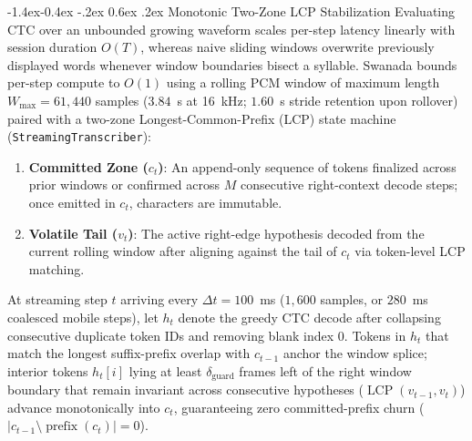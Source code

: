 \documentclass[10pt,twocolumn]{article}
\makeatletter
\renewcommand\subsection{\@startsection{subsection}{2}{\z@}%
  {-1.4ex\@plus -0.4ex \@minus -.2ex}%
  {0.6ex \@plus .2ex}%
  {\normalfont\normalsize\bfseries}}
\makeatother
\begin{document}
\subsection{Monotonic Two-Zone LCP Stabilization}
Evaluating CTC over an unbounded growing waveform scales per-step latency linearly with session duration $O(T)$, whereas naive sliding windows overwrite previously displayed words whenever window boundaries bisect a syllable. Swanada bounds per-step compute to $O(1)$ using a rolling PCM window of maximum length $W_{\max} = 61{,}440$ samples ($3.84$~s at 16~kHz; $1.60$~s stride retention upon rollover) paired with a two-zone Longest-Common-Prefix (LCP) state machine (\texttt{StreamingTranscriber}):
\begin{enumerate}\setlength{\itemsep}{1pt}\setlength{\parskip}{0pt}
    \item \textbf{Committed Zone ($c_t$)}: An append-only sequence of tokens finalized across prior windows or confirmed across $M$ consecutive right-context decode steps; once emitted in $c_t$, characters are immutable.
    \item \textbf{Volatile Tail ($v_t$)}: The active right-edge hypothesis decoded from the current rolling window after aligning against the tail of $c_t$ via token-level LCP matching.
\end{enumerate}
At streaming step $t$ arriving every $\Delta t = 100$~ms ($1{,}600$ samples, or $280$~ms coalesced mobile steps), let $h_t$ denote the greedy CTC decode after collapsing consecutive duplicate token IDs and removing blank index $0$. Tokens in $h_t$ that match the longest suffix-prefix overlap with $c_{t-1}$ anchor the window splice; interior tokens $h_t[i]$ lying at least $\delta_{\text{guard}}$ frames left of the right window boundary that remain invariant across consecutive hypotheses ($\operatorname{LCP}(v_{t-1}, v_t)$) advance monotonically into $c_t$, guaranteeing zero committed-prefix churn ($|c_{t-1} \setminus \operatorname{prefix}(c_t)| = 0$).
\end{document}
